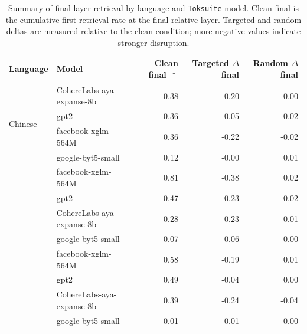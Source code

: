 \begin{table}[t]
\centering
\small
\begin{tabular}{llrrr}
\toprule
\textbf{Language} & \textbf{Model} & \textbf{Clean final $\uparrow$} & \textbf{Targeted $\Delta$ final} & \textbf{Random $\Delta$ final} \\
\midrule
\multirow{4}{*}{Chinese} & CohereLabs-aya-expanse-8b & 0.38 & -0.20 & 0.00 \\
 & gpt2 & 0.36 & -0.05 & -0.02 \\
 & facebook-xglm-564M & 0.36 & -0.22 & -0.02 \\
 & google-byt5-small & 0.12 & -0.00 & 0.01 \\
\addlinespace
\multirow{4}{*}{English} & facebook-xglm-564M & 0.81 & -0.38 & 0.02 \\
 & gpt2 & 0.47 & -0.23 & 0.02 \\
 & CohereLabs-aya-expanse-8b & 0.28 & -0.23 & 0.01 \\
 & google-byt5-small & 0.07 & -0.06 & -0.00 \\
\addlinespace
\multirow{4}{*}{Turkish} & facebook-xglm-564M & 0.58 & -0.19 & 0.01 \\
 & gpt2 & 0.49 & -0.04 & 0.00 \\
 & CohereLabs-aya-expanse-8b & 0.39 & -0.24 & -0.04 \\
 & google-byt5-small & 0.01 & 0.01 & 0.00 \\
\bottomrule
\end{tabular}
\caption{Summary of final-layer retrieval by language and \texttt{Toksuite} model. Clean final is the cumulative first-retrieval rate at the final relative layer. Targeted and random deltas are measured relative to the clean condition; more negative values indicate stronger disruption.}
\label{tab:layerwise_summary}
\end{table}
